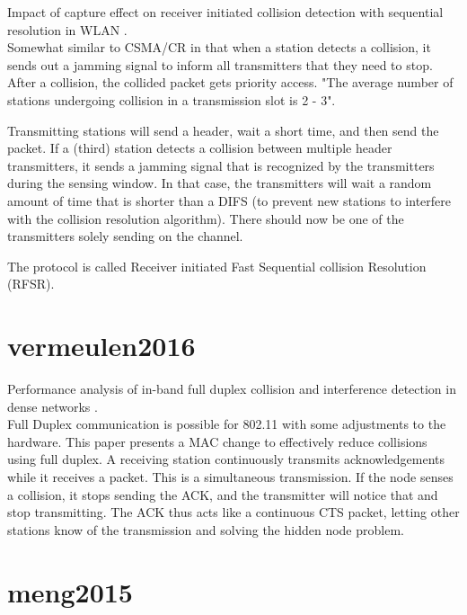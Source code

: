 Impact of capture effect on receiver initiated collision detection with sequential resolution in WLAN \cite{jibukumar2015}.\\

Somewhat similar to CSMA/CR in that when a station detects a collision, it sends out a jamming signal to inform all transmitters that they need to stop. After a collision, the collided packet gets priority access. "The average number of stations undergoing collision in a transmission slot is 2 - 3".

Transmitting stations will send a header, wait a short time, and then send the packet. If a (third) station detects a collision between multiple header transmitters, it sends a jamming signal that is recognized by the transmitters during the sensing window. In that case, the transmitters will wait a random amount of time that is shorter than a DIFS (to prevent new stations to interfere with the collision resolution algorithm). There should now be one of the transmitters solely sending on the channel.

The protocol is called Receiver initiated Fast Sequential collision Resolution (RFSR).



\section*{vermeulen2016}

Performance analysis of in-band full duplex collision and interference detection in dense networks \cite{vermeulen2016}.\\

Full Duplex communication is possible for 802.11 with some adjustments to the hardware. This paper presents a MAC change to effectively reduce collisions using full duplex. A receiving station continuously transmits acknowledgements while it receives a packet. This is a simultaneous transmission. If the node senses a collision, it stops sending the ACK, and the transmitter will notice that and stop transmitting. The ACK thus acts like a continuous CTS packet, letting other stations know of the transmission and solving the hidden node problem.



\section*{meng2015}

